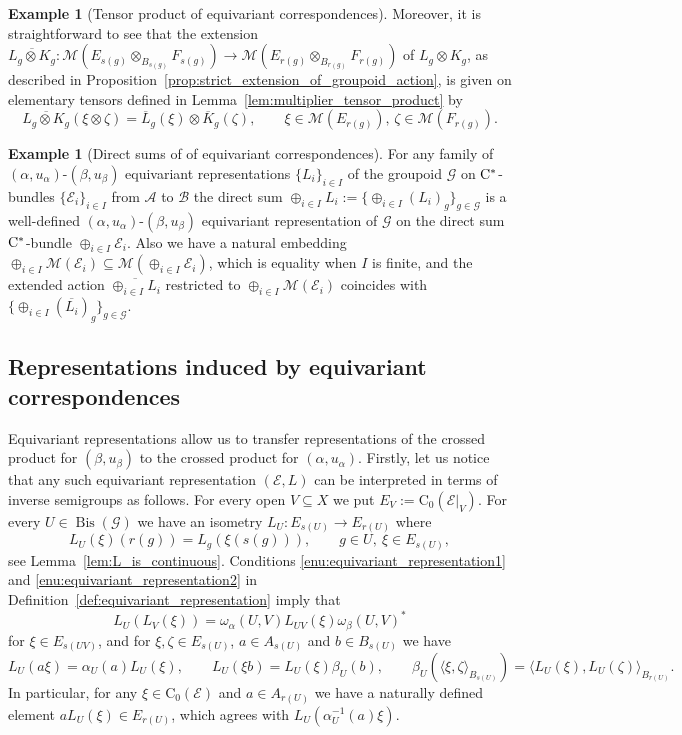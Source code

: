 \documentclass[11 pt, leqno]{amsart}
\numberwithin{equation}{section}
\theoremstyle{plain}
\theoremstyle{definition}
\newtheorem{ex}[thm]{Example}
\newcommand*{\contz}{\mathrm{C_0}}%
\DeclareMathOperator{\Bis}{Bis}
\newcommand{\B}{\mathcal B}
\newcommand{\M}{\mathcal M}
\newcommand{\G}{\mathcal G} %
\newcommand{\EE}{\mathcal E}
\newcommand{\A}{\mathcal A}
\newcommand{\cst}{\ifmmode\mathrm{C}^*\else{$\mathrm{C}^*$}\fi}
\begin{document}
\begin{ex}[Tensor product of equivariant correspondences]
Moreover, it is straightforward to see that the extension  $\overline{L_g \otimes K_g}:\M(E_{s(g)}\otimes_{B_{s(g)}} F_{s(g)})\to \M(E_{r(g)}\otimes_{B_{r(g)}} F_{r(g)})$ of $L_g \otimes K_g$, as described in Proposition~\ref{prop:strict_extension_of_groupoid_action}, is given on elementary tensors defined in Lemma~\ref{lem:multiplier_tensor_product} by
\[
    \overline{L_g \otimes K_g}(\xi\otimes \zeta) = \overline{L}_g(\xi)\otimes  \overline{K}_g(\zeta), \qquad \xi \in \M(E_{r(g)}), \, \zeta \in \M(F_{r(g)}).
\]
\end{ex}

\begin{ex}[Direct sums of of equivariant correspondences] 
For any family of $(\alpha, u_{\alpha})$-$(\beta,u_{\beta})$ equivariant representations $\{L_i\}_{i\in I}$ of the groupoid $\G$ on $\cst$-bundles $\{\EE_i\}_{i\in I}$ from $\A$ to $\B$ the direct sum $\oplus_{i\in I} L_i := \{ \oplus_{i\in I} (L_i)_g \}_{g\in \G}$ is a well-defined $(\alpha, u_{\alpha})$-$(\beta,u_{\beta})$ equivariant representation of $\G$ on the direct sum  $\cst$-bundle $\oplus_{i\in I} \EE_i$. 
Also we have a natural embedding $\oplus_{i\in I} \M(\EE_i)\subseteq \M(\oplus_{i\in I} \EE_i)$, which is equality when $I$ is finite, and  the extended action  $\overline{\oplus_{i\in I}L_i}$ restricted to $\oplus_{i\in I} \M(\EE_i)$ coincides with $\{\oplus_{i\in I}(\overline{L_i})_g\}_{g\in \G}$. %
\end{ex}


%
\subsection{Representations induced by equivariant correspondences}

Equivariant representations allow us to transfer representations of the crossed product for $(\beta,u_{\beta})$ to the crossed product for $(\alpha, u_{\alpha})$. 
Firstly, let us notice that any such equivariant representation $(\EE, L)$ can be interpreted in terms of inverse semigroups as follows. 
For every open $V\subseteq X$ we put $E_{V}:=\contz(\EE|_{V})$. 
For every $U\in \Bis(\G)$ we have an isometry $L_U: E_{s(U)}\to E_{r(U)}$ where
\[
    L_U(\xi)(r(g)) = L_{g}( \xi(s(g)) ) , \qquad g\in U , \ \xi \in E_{s(U)},
\]
see Lemma~\ref{lem:L_is_continuous}. 
Conditions \ref{enu:equivariant_representation1} and \ref{enu:equivariant_representation2} in Definition~\ref{def:equivariant_representation} imply that 
\[
    L_{U}(L_{V}(\xi)) = \omega_{\alpha}(U,V)L_{UV} (\xi) \omega_{\beta}(U,V)^*
\]
for $\xi \in E_{s(UV)}$, and for $\xi,\zeta \in E_{s(U)}$, $a\in A_{s(U)}$ and  $b\in B_{s(U)}$ we have 
\[
    L_{U} (a \xi)=\alpha_{U}(a)  L_{U}(\xi), \qquad 
    L_{U}(\xi b)=L_{U}(\xi) \beta_{U}(b) , \qquad 
    \beta_{U}(  \langle \xi, \zeta\rangle_{B_{s(U)}}) = \langle  L_{U}(\xi), L_{U}(\zeta)\rangle_{B_{r(U)}}.
\]
In particular, for any $\xi\in \contz(\EE)$ and $a\in A_{r(U)}$ we have a naturally defined element $aL_U(\xi)\in E_{r(U)}$, which agrees with $L_U(\alpha_{U}^{-1}(a)\xi)$.
\end{document}
